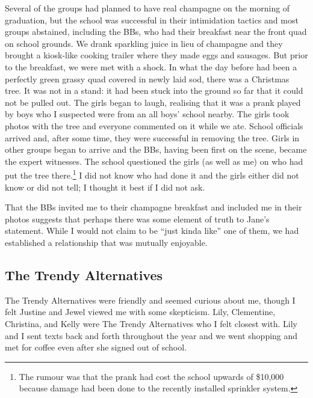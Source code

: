 Several of the groups had planned to have real champagne on the morning of graduation, but the school was successful in their intimidation tactics and most groups abstained, including the BBs, who had their breakfast near the front quad on school grounds.  We drank sparkling juice in lieu of champagne and they brought a kiosk-like cooking trailer where they made eggs and sausages.  But prior to the breakfast, we were met with a shock.  In what the day before had been a perfectly green grassy quad covered in newly laid sod, there was a Christmas tree.  It was not in a stand: it had been stuck into the ground so far that it could not be pulled out.  The girls began to laugh, realising that it was a prank played by boys who I suspected were from an all boys' school nearby.  The girls took photos with the tree and everyone commented on it while we ate.  School officials arrived and, after some time, they were successful in removing the tree.  Girls in other groups began to arrive and the BBs, having been first on the scene, became the expert witnesses.  The school questioned the girls (as well as me) on who had put the tree there.\footnote{The rumour was that the prank had cost the school upwards of \$10,000 because damage had been done to the recently installed sprinkler system.}  I did not know who had done it and the girls either did not know or did not tell; I thought it best if I did not ask.

That the BBs invited me to their champagne breakfast and included me in their photos suggests that perhaps there was some element of truth to Jane's statement.  While I would not claim to be ``just kinda like'' one of them, we had established a relationship that was mutually enjoyable.

\subsection{The Trendy Alternatives}
The Trendy Alternatives were friendly and seemed curious about me, though I felt Justine and Jewel viewed me with some skepticism.  Lily, Clementine, Christina, and Kelly were The Trendy Alternatives who I felt closest with.  Lily and I sent texts back and forth throughout the year and we went shopping and met for coffee even after she signed out of school.    

